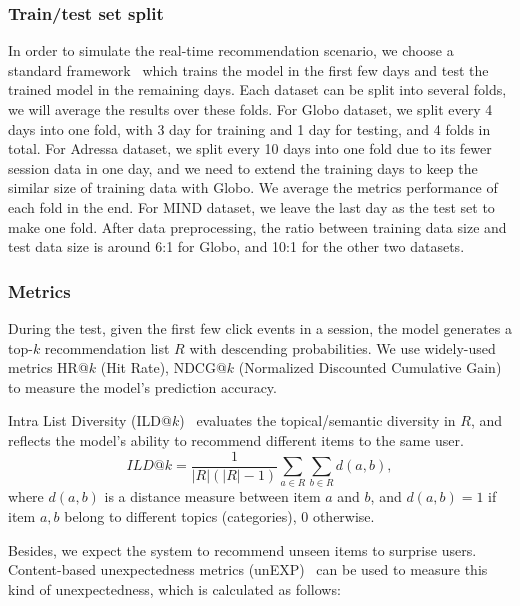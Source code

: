 \subsubsection{Train/test set split}
In order to simulate the real-time recommendation 
scenario, we choose a standard framework~\cite{jugovac_streamingrec:_2018} 
which trains the model in the first few days and test the trained model in the remaining
days. Each dataset can be split into several folds, 
we will average the results over these folds.
For Globo dataset, we split every 4 days into one fold, with 3 day for training and 1 day for testing, and 4 folds in total. 
For Adressa dataset, we split every 10 days into one fold due to its fewer session data in one day, and we need to extend the training days to keep the similar size of training data with Globo. 
We average the metrics performance of each fold in the end. For MIND dataset, we leave the last day as the test set to make one fold. 
After data preprocessing, the ratio between training data size and test data size 
is around 6:1 for Globo, and 10:1 for the other two datasets. 


\subsubsection{Metrics}
During the test, given the first few click events in a session, the model generates 
a top-$k$ recommendation list $R$ with descending probabilities. 
We use widely-used metrics HR@$k$ (Hit Rate), NDCG@$k$ (Normalized Discounted Cumulative Gain) to 
measure the model's prediction accuracy.

Intra List Diversity (ILD@$k$)~\cite{symeonidis2020session} evaluates the topical/semantic 
diversity in $R$, and reflects the model's ability to recommend different items to the same user. 
\begin{equation}
  ILD@k = \frac{1}{|R|(|R|-1)}\sum_{a\in R}\sum_{b\in R}d(a,b),
\end{equation}
where $d(a, b)$ is a distance measure between item $a$ and $b$, and 
$d(a, b) = 1$ if item $a, b$ belong to different topics (categories), 0 otherwise.

Besides, we expect the system to recommend unseen items to surprise users. Content-based unexpectedness metrics (unEXP)~\cite{kaminskas2014measuring} can be used to measure this kind of unexpectedness, which is calculated as follows:

